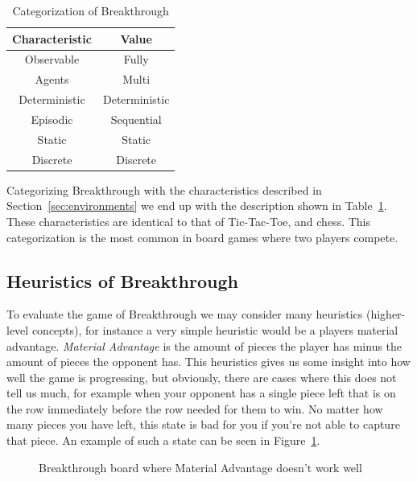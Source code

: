\begin{table}[ht]
	\centering
	\caption{Categorization of Breakthrough}
	\begin{tabular}{|c|c|}\hline
		\textbf{Characteristic} & \textbf{Value} \\\hline
		Observable              & Fully          \\\hline
		Agents                  & Multi          \\\hline
		Deterministic           & Deterministic  \\\hline
		Episodic                & Sequential     \\\hline
		Static                  & Static         \\\hline
		Discrete                & Discrete       \\\hline
	\end{tabular}
	\label{tab:breakthrough_cat}
\end{table}

Categorizing Breakthrough with the characteristics described in Section~\ref{sec:environments} we end up with the description shown in Table~\ref{tab:breakthrough_cat}. These characteristics are identical to that of Tic-Tac-Toe, and chess. This categorization is the most common in board games where two players compete.

\subsection{Heuristics of Breakthrough}

To evaluate the game of Breakthrough we may consider many heuristics (higher-level concepts), for instance a very simple heuristic would be a players material advantage. \textit{Material Advantage} is the amount of pieces the player has minus the amount of pieces the opponent has. This heuristics gives us some insight into how well the game is progressing, but obviously, there are cases where this does not tell us much, for example when your opponent has a single piece left that is on the row immediately before the row needed for them to win. No matter how many pieces you have left, this state is bad for you if you're not able to capture that piece. An example of such a state can be seen in Figure~\ref{fig:bt_h1_bad}.

\begin{figure}[]
	\centering
	\caption{Breakthrough board where Material Advantage doesn't work well}
	\label{fig:bt_h1_bad}
\end{figure}

